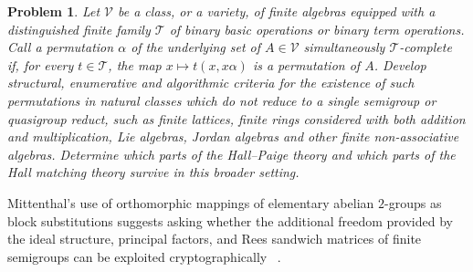 \documentclass[11pt]{article}
\theoremstyle{plain}
\newtheorem{problem}{Problem}[section]
\theoremstyle{remark}
\theoremstyle{definition}
\theoremstyle{plain}
\begin{document}
\begin{problem}\label{p:other-algebras}
Let $\mathcal V$ be a class, or a variety, of finite algebras equipped with a
distinguished finite family $\mathcal T$ of binary basic operations or binary
term operations. Call a permutation $\alpha$ of the underlying set of
$A\in\mathcal V$ simultaneously $\mathcal T$-complete if, for every
$t\in\mathcal T$, the map
\(x\mapsto t(x,x\alpha)\)
is a permutation of $A$. Develop structural, enumerative and algorithmic
criteria for the existence of such permutations in natural classes which do not
reduce to a single semigroup or quasigroup reduct, such as finite lattices,
finite rings considered with both addition and multiplication, Lie algebras,
Jordan algebras and other finite non-associative algebras. Determine which
parts of the Hall--Paige theory and which parts of the Hall matching theory
survive in this broader setting.
\end{problem}

Mittenthal's use of orthomorphic mappings of elementary abelian $2$-groups
as block substitutions suggests asking whether the additional freedom
provided by the ideal structure, principal factors, and Rees sandwich
matrices of finite semigroups can be exploited cryptographically
~\cite[pp.~59--60]{Mittenthal}.
\end{document}
